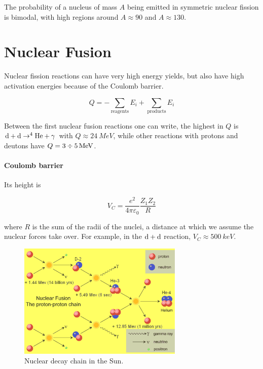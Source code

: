 \documentclass{article}
\begin{document}
The probability of a nucleus of mass \(A\) being emitted in symmetric nuclear fission is bimodal, with high regions around \(A \approx 90\) and \(A \approx 130\).

\section{Nuclear Fusion}

Nuclear fission reactions can have very high energy yields,  but also have high activation energies because of the Coulomb barrier.

\begin{equation}
    Q = - \sum _ \text{reagents} E_i + \sum _{\text{products}} E_i
\end{equation}

Between the first nuclear fusion reactions one can write, the highest in \(Q\) is \(\ce{d}+\ce{d} \rightarrow ^{4} \ce{He} + \gamma\) with \(Q  \approx  \SI{24}{MeV} \), while other reactions with protons and deutons have \(Q = 3 \divisionsymbol \SI{5}{MeV} \).

\paragraph{Coulomb barrier}

Its height is

\begin{equation}
    V_C = \frac{e^2}{4 \pi \varepsilon_0} \frac{Z_1 Z_2}{R}
\end{equation}

where \(R\) is the sum of the radii of the nuclei, a distance at which we assume the nuclear forces take over. For example, in the \(\ce{d} + \ce{d}\) reaction, \(V_C \approx \SI{500}{keV} \).

\begin{figure}[H]
    \centering
    \includegraphics[width=0.7\textwidth]{../figures/sun_nuclear_fusion.png}
    \caption{Nuclear decay chain in the Sun.}
    \label{fig:nuclear-fusion-sun}
\end{figure}
\end{document}
